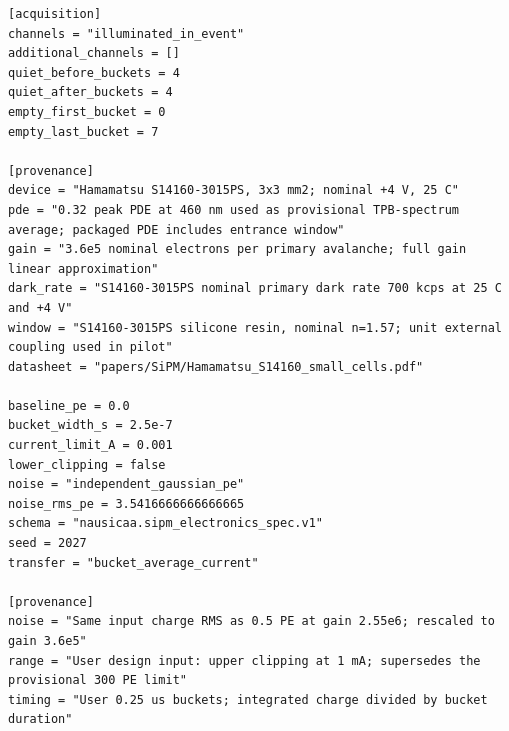 \documentclass[11pt,a4paper]{article}
\begin{document}
\begin{Verbatim}[breaklines,breakanywhere,fontsize=\footnotesize]
[acquisition]
channels = "illuminated_in_event"
additional_channels = []
quiet_before_buckets = 4
quiet_after_buckets = 4
empty_first_bucket = 0
empty_last_bucket = 7

[provenance]
device = "Hamamatsu S14160-3015PS, 3x3 mm2; nominal +4 V, 25 C"
pde = "0.32 peak PDE at 460 nm used as provisional TPB-spectrum average; packaged PDE includes entrance window"
gain = "3.6e5 nominal electrons per primary avalanche; full gain linear approximation"
dark_rate = "S14160-3015PS nominal primary dark rate 700 kcps at 25 C and +4 V"
window = "S14160-3015PS silicone resin, nominal n=1.57; unit external coupling used in pilot"
datasheet = "papers/SiPM/Hamamatsu_S14160_small_cells.pdf"

baseline_pe = 0.0
bucket_width_s = 2.5e-7
current_limit_A = 0.001
lower_clipping = false
noise = "independent_gaussian_pe"
noise_rms_pe = 3.5416666666666665
schema = "nausicaa.sipm_electronics_spec.v1"
seed = 2027
transfer = "bucket_average_current"

[provenance]
noise = "Same input charge RMS as 0.5 PE at gain 2.55e6; rescaled to gain 3.6e5"
range = "User design input: upper clipping at 1 mA; supersedes the provisional 300 PE limit"
timing = "User 0.25 us buckets; integrated charge divided by bucket duration"
\end{Verbatim}
\end{document}
